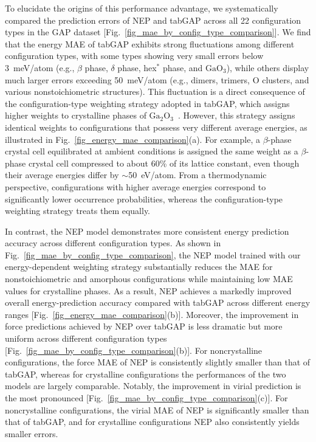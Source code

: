 \documentclass[%
reprint,
superscriptaddress,
 amsmath,amssymb,
 aps,
]{revtex4-2}
\newcommand{\ga}{$\text{Ga}_2\text{O}_3$}
\begin{document}
To elucidate the origins of this performance advantage, we systematically compared 
the prediction errors of NEP and tabGAP across all 22 configuration types in the GAP dataset
[Fig.~\ref{fig_mae_by_config_type_comparison}].
We find that the energy MAE of tabGAP exhibits strong fluctuations among different configuration
types, with some types showing very small errors below 3~meV/atom (e.g., $\beta$ phase,
$\delta$ phase, hex$^{*}$ phase, and $\text{GaO}_3$), while others display much larger errors
exceeding 50~meV/atom (e.g., dimers, trimers, O clusters, and various nonstoichiometric
structures).
This fluctuation is a direct consequence of the configuration-type weighting strategy adopted
in tabGAP, which assigns higher weights to crystalline phases of \ga\ \cite{zhao_complex_2023}.
However, this strategy assigns identical weights to configurations that possess very different
average energies, as illustrated in Fig.~\ref{fig_energy_mae_comparison}(a).
For example, a $\beta$-phase crystal cell equilibrated at ambient conditions is assigned the
same weight as a $\beta$-phase crystal cell compressed to about 60\% of its lattice constant,
even though their average energies differ by $\sim$50~eV/atom.
From a thermodynamic perspective, configurations with higher average energies correspond to
significantly lower occurrence probabilities, whereas the configuration-type weighting strategy 
treats them equally.

In contrast, the NEP model demonstrates more consistent energy prediction accuracy
across different configuration types.
As shown in Fig.~\ref{fig_mae_by_config_type_comparison}, the NEP model trained with our 
energy-dependent weighting strategy 
substantially reduces the MAE for nonstoichiometric and amorphous
configurations while maintaining low MAE values for crystalline phases.
As a result, NEP achieves a markedly improved overall energy-prediction accuracy compared with
tabGAP across different energy ranges
[Fig.~\ref{fig_energy_mae_comparison}(b)].
Moreover, the improvement in force predictions achieved by NEP over tabGAP is less dramatic
but more uniform across different configuration types
[Fig.~\ref{fig_mae_by_config_type_comparison}(b)].
For noncrystalline configurations, the force MAE of NEP is consistently slightly smaller
than that of tabGAP, whereas for crystalline configurations the performances of the two
models are largely comparable.
Notably, the improvement in virial prediction is the most pronounced
[Fig.~\ref{fig_mae_by_config_type_comparison}(c)].
For noncrystalline configurations, the virial MAE of NEP is significantly smaller than that
of tabGAP, and for crystalline configurations NEP also consistently yields smaller errors.
\end{document}
